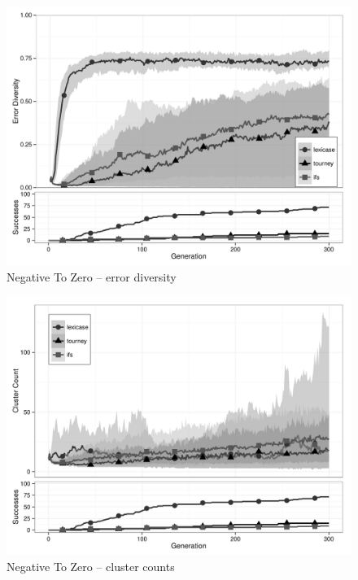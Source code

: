 \begin{figure}[p] %
\centering
\includegraphics[width=11.5cm]{negative-to-zero-diversity.pdf}
\caption{Negative To Zero -- error diversity}
\label{negative-to-zeroDiv}
\end{figure}

\begin{figure}[p] %
\centering
\includegraphics[width=11.5cm]{negative-to-zero-cluster.pdf}
\caption{Negative To Zero -- cluster counts}
\label{negative-to-zeroClu}
\end{figure}

